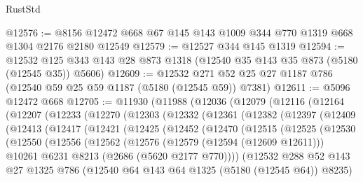 \begin{lexlean}{RustStd}
\begin{coremodule}
@12576 := @8156 @12472 @668 @67 @145 @143 @1009 @344 @770 @1319 @668 @1304 @2176 @2180 @12549
@12579 := @12527 @344 @145 @1319
@12594 := @12532 @125 @343 @143 @28 @873 @1318 (@12540 @35 @143 @35 @873 (@5180 (@12545 @35)) @5606)
@12609 := @12532 @271 @52 @25 @27 @1187 @786 (@12540 @59 @25 @59 @1187 (@5180 (@12545 @59)) @7381)
@12611 := @5096 @12472 @668
@12705 := @11930
    (@11988
      (@12036
        (@12079
          (@12116
            (@12164
              (@12207
                (@12233
                  (@12270
                    (@12303
                      (@12332
                        (@12361
                          (@12382
                            (@12397
                              (@12409
                                (@12413
                                  (@12417
                                    (@12421
                                      (@12425
                                        (@12452
                                          (@12470
                                            (@12515
                                              (@12525
                                                (@12530
                                                  (@12550
                                                    (@12556
                                                      (@12562
                                                        (@12576
                                                          (@12579 (@12594 (@12609 @12611)))
                                                          @10261
                                                          @6231
                                                          @8213
                                                          (@2686 (@5620 @2177 @770))))
                                                      (@12532
                                                        @288
                                                        @52
                                                        @143
                                                        @27
                                                        @1325
                                                        @786
                                                        (@12540
                                                          @64
                                                          @143
                                                          @64
                                                          @1325
                                                          (@5180 (@12545 @64))
                                                          @8235)

\end{coremodule}
\end{lexlean}
